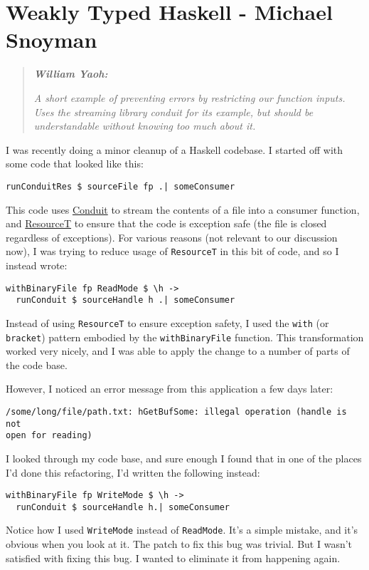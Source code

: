 \chapter{Weakly Typed Haskell - Michael Snoyman}

\begin{quotation}
\noindent\textit{\textbf{William Yaoh:}}

\textit{A short example of preventing errors by restricting our function inputs. Uses the streaming library conduit for its example, but should be understandable without knowing too much about it.}
\end{quotation}


I was recently doing a minor cleanup of a Haskell codebase. I started off with some code that looked like this:

\begin{verbatim}
runConduitRes $ sourceFile fp .| someConsumer
\end{verbatim}
This code uses \href{https://haskell-lang.org/library/conduit}{Conduit} to stream the contents of a file into a consumer function, and \href{https://www.fpcomplete.com/blog/2017/06/understanding-resourcet}{ResourceT} to ensure that the code is exception safe (the file is closed regardless of exceptions). For various reasons (not relevant to our discussion now), I was trying to reduce usage of \texttt{ResourceT} in this bit of code, and so I instead wrote:

\begin{verbatim}
withBinaryFile fp ReadMode $ \h ->
  runConduit $ sourceHandle h .| someConsumer
\end{verbatim}
Instead of using \texttt{ResourceT} to ensure exception safety, I used the \texttt{with} (or \texttt{bracket}) pattern embodied by the \texttt{withBinaryFile} function. This transformation worked very nicely, and I was able to apply the change to a number of parts of the code base.

However, I noticed an error message from this application a few days later:

\begin{verbatim}
/some/long/file/path.txt: hGetBufSome: illegal operation (handle is not 
open for reading)
\end{verbatim}
I looked through my code base, and sure enough I found that in one of the places I'd done this refactoring, I'd written the following instead:

\begin{verbatim}
withBinaryFile fp WriteMode $ \h ->
  runConduit $ sourceHandle h.| someConsumer
\end{verbatim}
Notice how I used \texttt{WriteMode} instead of \texttt{ReadMode}. It's a simple mistake, and it's obvious when you look at it. The patch to fix this bug was trivial. But I wasn't satisfied with fixing this bug. I wanted to eliminate it from happening again.

